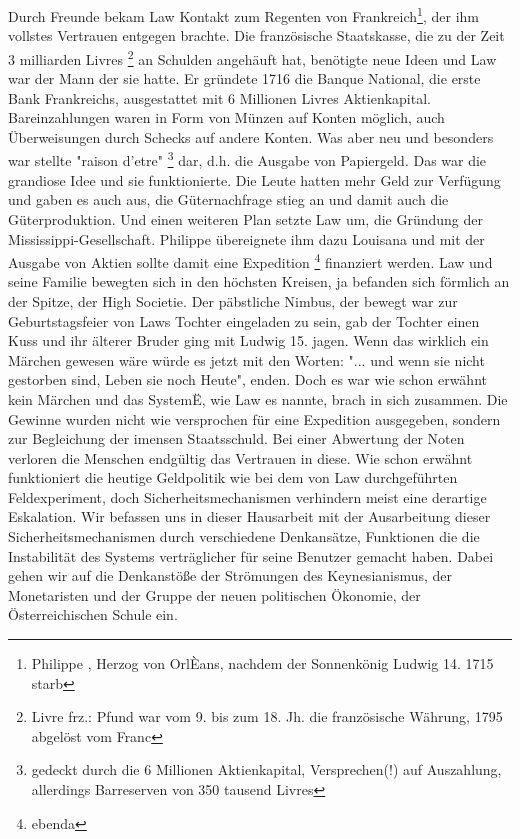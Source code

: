 \documentclass[
onecolumn,
a4paper,
abstracton,
parskip=half
,final
]{scrartcl}
\begin{document}
Durch Freunde bekam Law Kontakt zum Regenten von Frankreich\footnote[6]{Philippe , Herzog von OrlÈans, nachdem der Sonnenk{\"o}nig Ludwig 14. 1715 starb}, der ihm vollstes Vertrauen entgegen brachte. Die franz{\"o}sische Staatskasse, die zu der Zeit 3 milliarden Livres \footnote[7]{Livre frz.: Pfund war vom 9. bis zum 18. Jh. die franz{\"o}sische W{\"a}hrung, 1795 abgel{\"o}st vom Franc} an Schulden angeh{\"a}uft hat, ben{\"o}tigte neue Ideen und Law war der Mann der sie hatte. Er gr{\"u}ndete 1716 die Banque National, die erste Bank Frankreichs, ausgestattet mit 6 Millionen Livres Aktienkapital. Bareinzahlungen waren in Form von M{\"u}nzen auf Konten m{\"o}glich, auch {\"U}berweisungen durch Schecks auf andere Konten. Was aber neu und besonders war stellte "raison d'etre" \footnote[8]{gedeckt durch die 6 Millionen Aktienkapital, Versprechen(!) auf Auszahlung, allerdings Barreserven von 350 tausend Livres} dar, d.h. die Ausgabe von Papiergeld. Das war die grandiose Idee und sie funktionierte. Die Leute hatten mehr Geld zur Verf{\"u}gung und gaben es auch aus, die G{\"u}ternachfrage stieg an und damit auch die G{\"u}terproduktion. Und einen weiteren Plan setzte Law um, die Gr{\"u}ndung der Mississippi-Gesellschaft. Philippe {\"u}bereignete ihm dazu Louisana und mit der Ausgabe von Aktien sollte damit eine Expedition \footnote[9]{ebenda} finanziert werden. Law und seine Familie bewegten sich in den h{\"o}chsten Kreisen, ja befanden sich f{\"o}rmlich an der Spitze, der High Societie. Der p{\"a}bstliche Nimbus, der bewegt war zur Geburtstagsfeier von Laws Tochter eingeladen zu sein, gab der Tochter einen Kuss und ihr {\"a}lterer Bruder ging mit Ludwig 15. jagen. Wenn das wirklich ein M{\"a}rchen gewesen w{\"a}re w{\"u}rde es jetzt mit den Worten: "... und wenn sie nicht gestorben sind, Leben sie noch Heute", enden. Doch es war wie schon erw{\"a}hnt kein M{\"a}rchen und das SystemË, wie Law es nannte, brach in sich zusammen. Die Gewinne wurden nicht wie versprochen f{\"u}r eine Expedition ausgegeben, sondern zur Begleichung der imensen Staatsschuld. Bei einer Abwertung der Noten verloren die Menschen endg{\"u}ltig das Vertrauen in diese.
Wie schon erw{\"a}hnt funktioniert die heutige Geldpolitik wie bei dem von Law durchgef{\"u}hrten Feldexperiment, doch Sicherheitsmechanismen verhindern meist eine derartige Eskalation.
Wir befassen uns in dieser Hausarbeit mit der Ausarbeitung dieser Sicherheitsmechanismen durch verschiedene Denkans{\"a}tze, Funktionen die die Instabilit{\"a}t des Systems vertr{\"a}glicher f{\"u}r seine Benutzer gemacht haben. Dabei gehen wir auf die Denkanst{\"o}{\ss}e der Str{\"o}mungen des Keynesianismus, der Monetaristen und der Gruppe der neuen politischen  {\"O}konomie, der {\"O}sterreichischen Schule ein.
\end{document}
